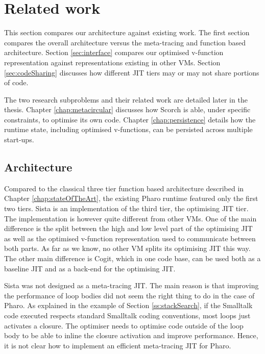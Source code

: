 \documentclass[a4paper,12pt,twoside]{../includes/ThesisStyle}
\begin{document}

\section{Related work}
\label{sec:relatedWorkArch}

This section compares our architecture against existing work. The first section compares the overall architecture versus the meta-tracing and function based architecture. Section \ref{sec:interface} compares our optimised v-function representation against representations existing in other VMs. Section \ref{sec:codeSharing} discusses how different JIT tiers may or may not share portions of code.

The two research subproblems and their related work are detailed later in the thesis. Chapter \ref{chap:metacircular} discusses how Scorch is able, under specific constraints, to optimise its own code. Chapter \ref{chap:persistence} details how the runtime state, including optimised v-functions, can be persisted across multiple start-ups.

\subsection{Architecture}
\label{sec:relWArch}

Compared to the classical three tier function based architecture described in Chapter \ref{chap:stateOfTheArt}, the existing Pharo runtime featured only the first two tiers. Sista is an implementation of the third tier, the optimising JIT tier. The implementation is however quite different from other VMs. One of the main difference is the split between the high and low level part of the optimising JIT as well as the optimised v-function representation used to communicate between both parts. As far as we know, no other VM splits its optimising JIT this way. The other main difference is Cogit, which in one code base, can be used both as a baseline JIT and as a back-end for the optimising JIT.

Sista was not designed as a meta-tracing JIT. The main reason is that improving the performance of loop bodies did not seem the right thing to do in the case of Pharo. As explained in the example of Section \ref{ss:stackSearch}, if the Smalltalk code executed respects standard Smalltalk coding conventions, most loops just activates a closure. The optimiser needs to optimise code outside of the loop body to be able to inline the closure activation and improve performance. Hence, it is not clear how to implement an efficient meta-tracing JIT for Pharo.
\end{document}
